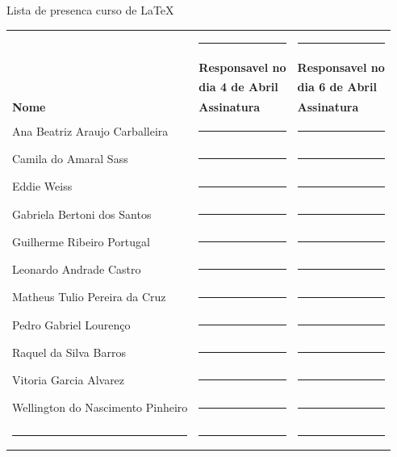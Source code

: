 \documentclass[12pt]{article}
\begin{document}
	\pagestyle{fancy} %
	\begin{center}
		\textcolor{IEEEBlue}{\LARGE Lista de presenca curso de \LaTeX}
	\end{center}
	\vspace{1.5cm}
	\begin{longtable}{lll}
										  			& \rule{4cm}{.1mm} 			&\rule{4cm}{.1mm}			\\[5pt]
										  			& \textbf{Responsavel no}	&\textbf{Responsavel no} 	\\
										  			& \textbf{dia 4 de Abril}	&\textbf{dia 6 de Abril} 	\\[25pt]
		\textbf{Nome}    				  			& \textbf{Assinatura} 		&\textbf{Assinatura} 		\\[15pt]
		Ana Beatriz Araujo Carballeira 	 \hrulefill & \rule{4cm}{.1mm} 			&\rule{4cm}{.1mm}			\\[15pt]
		Camila do Amaral  Sass 			 \hrulefill & \rule{4cm}{.1mm} 			&\rule{4cm}{.1mm}			\\[15pt]
		Eddie Weiss 					 \hrulefill & \rule{4cm}{.1mm} 			&\rule{4cm}{.1mm}			\\[15pt]
		Gabriela Bertoni dos Santos      \hrulefill & \rule{4cm}{.1mm} 			&\rule{4cm}{.1mm}			\\[15pt]
		Guilherme Ribeiro Portugal       \hrulefill & \rule{4cm}{.1mm} 			&\rule{4cm}{.1mm}			\\[15pt]
		Leonardo Andrade Castro          \hrulefill & \rule{4cm}{.1mm} 			&\rule{4cm}{.1mm}			\\[15pt]
		Matheus Tulio Pereira da Cruz    \hrulefill & \rule{4cm}{.1mm} 			&\rule{4cm}{.1mm}			\\[15pt]
		Pedro Gabriel Lourenço           \hrulefill & \rule{4cm}{.1mm} 			&\rule{4cm}{.1mm}			\\[15pt]
		Raquel da Silva Barros           \hrulefill & \rule{4cm}{.1mm} 			&\rule{4cm}{.1mm}			\\[15pt]
		Vitoria Garcia Alvarez           \hrulefill & \rule{4cm}{.1mm} 			&\rule{4cm}{.1mm}			\\[15pt]
		Wellington do Nascimento Pinheiro\hrulefill & \rule{4cm}{.1mm} 			&\rule{4cm}{.1mm}			\\[15pt]
		\rule{7cm}{.1mm} 				 			& \rule{4cm}{.1mm} 			&\rule{4cm}{.1mm}			\\[15pt]

\end{longtable}
\end{document}
